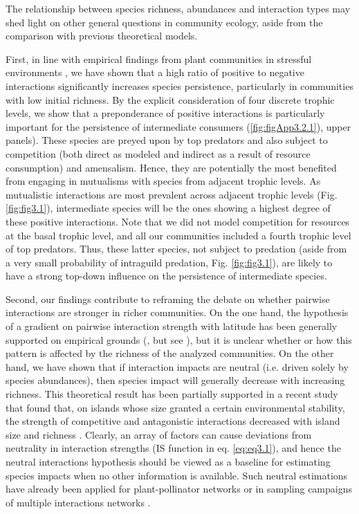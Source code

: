 The relationship between species richness, abundances and interaction types may shed light on other general questions in community ecology, aside from the comparison with previous theoretical models.

First, in line with empirical findings from plant communities in stressful environments \citep{Soliveres2014, Cavieres2009}, we have shown that a high ratio of positive to negative interactions significantly increases species persistence, particularly in communities with low initial richness. By the explicit consideration of four discrete trophic levels, we show that a preponderance of positive interactions is particularly important for the persistence of intermediate consumers (\cref{fig:figApp3.2.1}), upper panels). These species are preyed upon by top predators and also subject to competition (both direct as modeled and indirect as a result of resource consumption) and amensalism. Hence, they are potentially the most benefited from engaging in mutualisms with species from adjacent trophic levels. As mutualistic interactions are most prevalent across adjacent trophic levels (Fig. \ref{fig:fig3.1}), intermediate species will be the ones showing a highest degree of these positive interactions. Note that we did not model competition for resources at the basal trophic level, and all our communities included a fourth trophic level of top predators. Thus, these latter species, not subject to predation (aside from a very small probability of intraguild predation, Fig. \ref{fig:fig3.1}), are likely to have a strong top-down influence on the persistence of intermediate species.

Second, our findings contribute to reframing the debate on whether pairwise interactions are stronger in richer communities. On the one hand, the hypothesis of a gradient on pairwise interaction strength with latitude has been generally supported on empirical grounds (\citealt{Schemske2009}, but see \citealt{Moles2016}), but it is unclear whether or how this pattern is affected by the richness of the analyzed communities. On the other hand, we have shown that if interaction impacts are neutral (i.e. driven solely by species abundances), then species impact will generally decrease with increasing richness. This theoretical result has been partially supported in a recent study that found that, on islands whose size granted a certain environmental stability, the strength of competitive and antagonistic interactions decreased with island size and richness \citep{Schoener2016}. Clearly, an array of factors can cause deviations from neutrality in interaction strengths (IS function in eq. \ref{eq:eq3.1}), and hence the neutral interactions hypothesis should be viewed as a baseline for estimating species impacts when no other information is available. Such neutral estimations have already been applied for plant-pollinator networks \citep{Vazquez2012} or in sampling campaigns of multiple interactions networks \citep{Pocock2012}.

